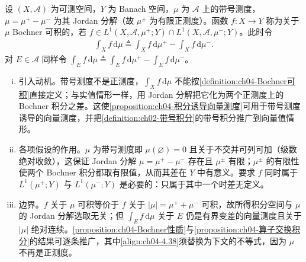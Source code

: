 \documentclass[../../main.tex]{subfiles}%
\begin{document}
\begin{definition}\label{definition:ch04-带号Bochner}
设 $(X,\mathcal{A})$ 为可测空间，$Y$ 为 Banach 空间，$\mu$ 为 $\mathcal{A}$ 上的带号测度，$\mu=\mu^+-\mu^-$ 为其 Jordan 分解（故 $\mu^\pm$ 为有限正测度）。函数 $f:X\to Y$ 称为关于 $\mu$ Bochner 可积的，若 $f\in L^1(X,\mathcal{A},\mu^+;Y)\cap L^1(X,\mathcal{A},\mu^-;Y)$。此时令
\begin{align*}
\int_X f\,\mathrm{d}\mu\triangleq \int_X f\,\mathrm{d}\mu^+-\int_X f\,\mathrm{d}\mu^-.
\end{align*}
对 $E\in\mathcal{A}$ 同样令 $\int_E f\,\mathrm{d}\mu\triangleq\int_E f\,\mathrm{d}\mu^+-\int_E f\,\mathrm{d}\mu^-$。
\end{definition}

\begin{remark}\label{remark:ch04-带号Bochner动机}
\begin{enumerate}[(i)]
\item 引入动机。带号测度不是正测度，$\int_Xf\,\mathrm{d}\mu$ 不能按\cref{definition:ch04-Bochner可积}直接定义；与实值情形一样，用 Jordan 分解把它化为两个正测度上的 Bochner 积分之差。这使\cref{proposition:ch04-积分诱导向量测度}可用于带号测度诱导的向量测度，并把\cref{definition:ch02-带号积分}的带号积分推广到向量值情形。

\item 各项假设的作用。$\mu$ 为带号测度即 $\mu(\varnothing)=0$ 且关于不交并可列可加（级数绝对收敛），这保证 Jordan 分解 $\mu=\mu^+-\mu^-$ 存在且 $\mu^\pm$ 有限；$\mu^\pm$ 的有限性使两个 Bochner 积分都取有限值，从而其差在 $Y$ 中有意义。要求 $f$ 同时属于 $L^1(\mu^+;Y)$ 与 $L^1(\mu^-;Y)$ 是必要的：只属于其中一个时差无定义。

\item 边界。$f$ 关于 $\mu$ 可积等价于 $f$ 关于 $|\mu|=\mu^++\mu^-$ 可积，故所得积分空间与 $\mu$ 的 Jordan 分解选取无关；但 $\int_Ef\,\mathrm{d}\mu$ 关于 $E$ 仍是有界变差的向量测度且关于 $|\mu|$ 绝对连续。\cref{proposition:ch04-Bochner性质}与\cref{proposition:ch04-算子交换积分}的结果可逐条推广，其中\eqref{align:ch04-4.38}须替换为下文的不等式，因为 $\mu$ 不再是正测度。
\end{enumerate}
\end{remark}
\end{document}
